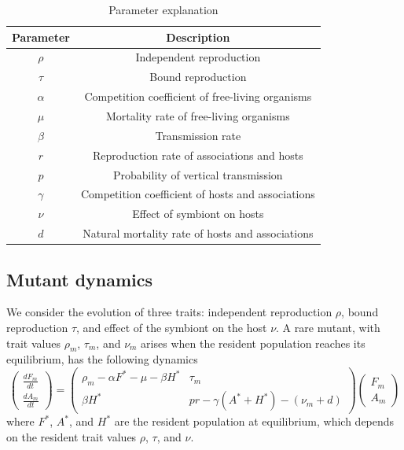 \documentclass[11pt]{article}
\begin{document}
\begin{table}[ht!]
	\centering
	\begin{tabular}{c| c}
		Parameter & Description \\
		\hline
		$\rho$ & Independent reproduction \\
		\hline 
		$\tau$ & Bound reproduction \\
		\hline
		$\alpha$ & Competition coefficient of free-living organisms \\
		\hline
		$\mu$ & Mortality rate of free-living organisms \\
		\hline
		$\beta$  & Transmission rate \\
		\hline
		$r$ & Reproduction rate of associations and hosts \\
		\hline
		$p$ & Probability of vertical transmission \\
		\hline
		$\gamma$ & Competition coefficient of hosts and associations \\
		\hline
		$\nu$ & Effect of symbiont on hosts \\
		\hline
		$d$ & Natural mortality rate of hosts and associations \\
		\hline
	\end{tabular}
	\caption{Parameter explanation}
	\label{table:parameters}
\end{table}

\subsection*{Mutant dynamics}
We consider the evolution of three traits: independent reproduction $\rho$, bound reproduction $\tau$, and effect of the symbiont on the host $\nu$. A rare mutant, with trait values $\rho_m$, $\tau_m$, and $\nu_m$ arises when the resident population reaches its equilibrium, has the following dynamics
\begin{equation}
	\begin{pmatrix}
		\frac{d F_m}{dt} \\
		\frac{d A_m}{dt}
	\end{pmatrix}
	=
	\begin{pmatrix}
		\rho_m - \alpha F^* - \mu - \beta H^* & \tau_m \\
		\beta H^* & p r - \gamma(A^* + H^*) - (\nu_m + d)
	\end{pmatrix}
	  \begin{pmatrix}
	  	F_m \\ A_m
	  \end{pmatrix}
	  \label{eq:mutant_dyn}
\end{equation}
where $F^*$, $A^*$, and $H^*$ are the resident population at equilibrium, which depends on the resident trait values $\rho$, $\tau$, and $\nu$. 
\end{document}
